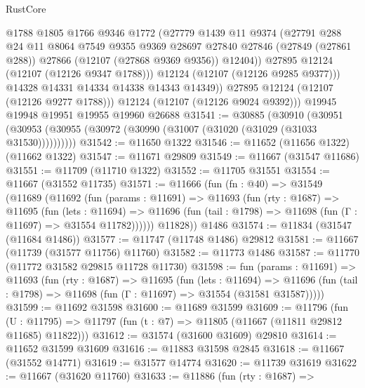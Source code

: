 \begin{lexlean}{RustCore}
\begin{coremodule}
                @1788
                @1805
                @1766
                @9346
                @1772
                (@27779
                  @1439
                  @11
                  @9374
                  (@27791
                    @288
                    @24
                    @11
                    @8064
                    @7549
                    @9355
                    @9369
                    @28697
                    @27840
                    @27846
                    (@27849 (@27861 @288))
                    @27866
                    (@12107 (@27868 @9369 @9356))
                    @12404))
                @27895
                @12124
                (@12107 (@12126 @9347 @1788)))
              @12124
              (@12107 (@12126 @9285 @9377)))
            @14328
            @14331
            @14334
            @14338
            @14343
            @14349))
        @27895
        @12124
        (@12107 (@12126 @9277 @1788)))
      @12124
      (@12107 (@12126 @9024 @9392)))
    @19945
    @19948
    @19951
    @19955
    @19960
    @26688
@31541 := @30885
    (@30910 (@30951 (@30953 (@30955 (@30972 (@30990 (@31007 (@31020 (@31029 (@31033 @31530))))))))))
@31542 := @11650 @1322
@31546 := @11652 (@11656 @1322) (@11662 @1322)
@31547 := @11671 @29809
@31549 := @11667 (@31547 @11686)
@31551 := @11709 (@11710 @1322)
@31552 := @11705 @31551
@31554 := @11667 (@31552 @11735)
@31571 := @11666
    (fun (fn : @40) =>
    @31549
      (@11689
        (@11692
          (fun (params : @11691) =>
          @11693
            (fun (rty : @1687) =>
            @11695
              (fun (lets : @11694) =>
              @11696 (fun (tail : @1798) => @11698 (fun (Γ : @11697) => @31554 @11782))))))
        @11828))
    @1486
@31574 := @11834 (@31547 (@11684 @1486))
@31577 := @11747 (@11748 @1486) @29812
@31581 := @11667 (@11739 (@31577 @11756) @11760)
@31582 := @11773 @1486
@31587 := @11770 (@11772 @31582 @29815 @11728 @11730)
@31598 := fun (params : @11691) =>
  @11693
    (fun (rty : @1687) =>
    @11695
      (fun (lets : @11694) =>
      @11696 (fun (tail : @1798) => @11698 (fun (Γ : @11697) => @31554 (@31581 @31587)))))
@31599 := @11692 @31598
@31600 := @11689 @31599
@31609 := @11796
    (fun (U : @11795) => @11797 (fun (t : @7) => @11805 (@11667 (@11811 @29812 @11685) @11822)))
@31612 := @31574 (@31600 @31609) @29810
@31614 := @11652 @31599 @31609
@31616 := @11883 @31598 @2845
@31618 := @11667 (@31552 @14771)
@31619 := @31577 @14774
@31620 := @11739 @31619
@31622 := @11667 (@31620 @11760)
@31633 := @11886
    (fun (rty : @1687) =>

\end{coremodule}
\end{lexlean}
